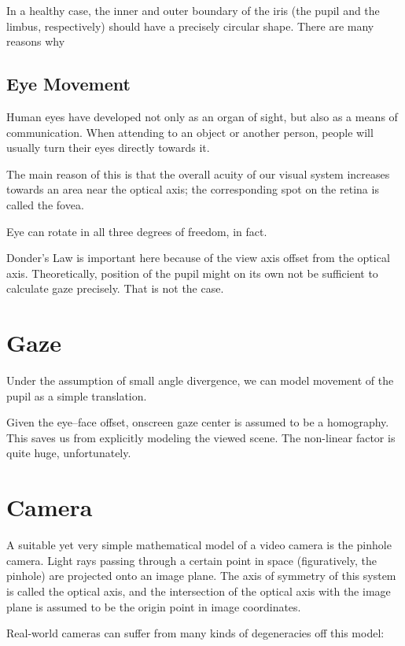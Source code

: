 In a healthy case, the inner and outer boundary of the iris (the pupil and the limbus, respectively) should have a precisely circular shape.
There are many reasons why \todo{\dots}

\subsection{Eye Movement}

Human eyes have developed not only as an organ of sight, but also as a means of communication.
When attending to an object or another person, people will usually turn their eyes directly towards it.

The main reason of this is that the overall acuity of our visual system increases towards an area near the optical axis; the corresponding spot on the retina is called the fovea.

Eye can rotate in all three degrees of freedom, in fact.

Donder's Law is important here because of the view axis offset from the optical axis.
Theoretically, position of the pupil might on its own not be sufficient to calculate gaze precisely.
That is not the case.
\todo{\dots}

\section{Gaze}

Under the assumption of small angle divergence, we can model movement of the pupil as a simple translation.

Given the eye--face offset, onscreen gaze center is assumed to be a homography.
This saves us from explicitly modeling the viewed scene.
The non-linear factor is quite huge, unfortunately.

\section{Camera}

A suitable yet very simple mathematical model of a video camera is the pinhole camera.
Light rays passing through a certain point in space (figuratively, the pinhole) are projected onto an image plane.
The axis of symmetry of this system is called the optical axis, and the intersection of the optical axis with the image plane is assumed to be the origin point in image coordinates.

Real-world cameras can suffer from many kinds of degeneracies off this model:

